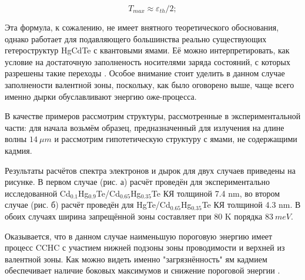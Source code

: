 \documentclass[../main.tex]{subfiles}
\begin{document}
        \begin{equation}
            \label{tmax}
            T_{max} \approx \varepsilon_{th} / 2;
        \end{equation}

        Эта формула, к сожалению, не имеет внятного теоретического обоснования,
        однако работает для подавляющего большинства реально существующих гетероструктур
        HgCdTe с квантовыми ямами. Её можно интерпретировать, как условие на достаточную
        заполненость носителями заряда состояний, с которых разрешены такие переходы \cite{Alymov:2018}.
        Особое внимание стоит уделить в данном случае заполнености валентной зоны, поскольку,
        как было оговорено выше, чаще всего именно дырки обуславливают энергию оже-процесса.

        В качестве примеров рассмотрим структуры, рассмотренные в экспериментальной части:
        для начала возьмём образец, предназначенный для излучения на длине волны $14~\mu m$
        и рассмотрим гипотетическую структуру с ямами, не содержащими кадмия.

        Результаты расчётов спектра электронов и дырок для двух случаев приведены на рисунке. В первом случае (рис. а) расчёт
        проведён для экспериментально исследованной Cd${}_{0.1}$Hg${}_{0.9}$Te/Cd${}_{0.65}$Hg${}_{0.35}$Te КЯ толщиной 7.4 nm, во втором случае (рис. б)
        расчёт проведён для HgTe/Cd${}_{0.65}$Hg${}_{0.35}$Te КЯ толщиной 4.3 nm. В обоих случаях ширина запрещённой зоны составляет при 
        80 K порядка $83~meV$. 

        Оказывается, что в данном случае наименьшую пороговую энергию имеет процесс
        CCHC с участием нижней подзоны зоны проводимости и верхней из валентной зоны.
        Как можно видеть именно "загрязнённость" ям кадмием обеспечивает наличие 
        боковых максимумов и снижение пороговой энергии \cite{Rumyantsev:IOP:2018}. 
\end{document}
